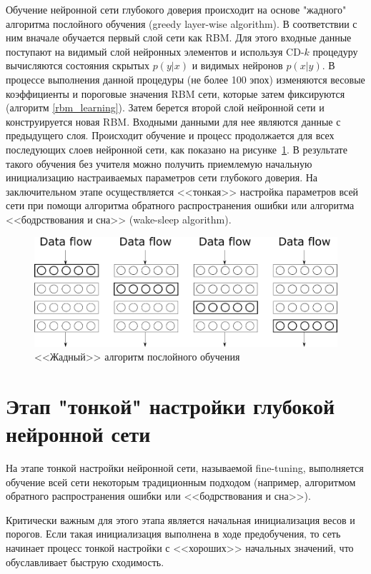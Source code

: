 Обучение нейронной сети глубокого доверия происходит на основе "жадного"{} алгоритма послойного обучения (greedy layer-wise algorithm). В соответствии с ним вначале обучается первый слой сети как RBM. Для этого входные данные поступают на видимый слой нейронных элементов и используя CD-$k$ процедуру вычисляются состояния скрытых $p(y \lvert x)$ и видимых нейронов $p(x \lvert y)$. В процессе выполнения данной процедуры (не более 100 эпох) изменяются весовые коэффициенты и пороговые значения RBM сети, которые затем фиксируются (алгоритм \ref{rbm_learning}). Затем берется второй слой нейронной сети и конструируется новая RBM. Входными данными для нее являются данные с предыдущего слоя. Происходит обучение и процесс продолжается для всех последующих слоев нейронной сети, как показано на рисунке~\ref{fig:pic1_4}. В результате такого обучения без учителя можно получить приемлемую начальную инициализацию настраиваемых параметров сети глубокого доверия. На заключительном этапе осуществляется <<тонкая>> настройка параметров всей сети при помощи алгоритма обратного распространения ошибки или алгоритма <<бодрствования и сна>> (wake-sleep algorithm). 

\begin{figure}[H]
	\centering
	\includegraphics[width=\textwidth]{author/part3/figures/pic1-4.png}
	\caption{<<Жадный>> алгоритм послойного обучения}
	\label{fig:pic1_4}
\end{figure}

\section{Этап "тонкой" настройки глубокой нейронной сети}

На этапе тонкой настройки нейронной сети, называемой fine-tuning, выполняется обучение всей сети некоторым традиционным подходом (например, алгоритмом обратного распространения ошибки или <<бодрствования и сна>>).

Критически важным для этого этапа является начальная инициализация весов и порогов. Если такая инициализация выполнена в ходе предобучения, то сеть начинает процесс тонкой настройки с <<хороших>> начальных значений, что обуславливает быструю сходимость.

